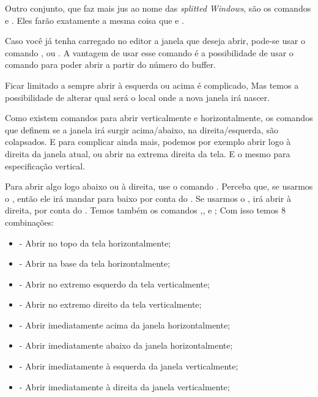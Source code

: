 
Outro conjunto, que faz mais jus ao nome das \textit{splitted Windows}, são os comandos  e 
.
Eles farão exatamente a mesma coisa que  e .


Caso você já tenha carregado no editor a janela que deseja abrir, pode-se usar o comando
, ou .
A vantagem de usar esse comando é a possibilidade de usar o comando 
para poder abrir a partir do número do buffer.


Ficar limitado a sempre abrir à esquerda ou acima é complicado,
Mas temos a possibilidade de alterar qual será o local onde a nova janela irá nascer.

Como existem comandos para abrir verticalmente e horizontalmente, os comandos que definem
se a janela irá surgir acima/abaixo, na direita/esquerda, são colapsados.
E para complicar ainda mais, podemos por exemplo abrir logo à direita da janela atual, ou
abrir na extrema direita da tela.
E o mesmo para especificação vertical.

Para abrir algo logo abaixo ou à direita, use o comando .
Perceba que, se usarmos o , então ele irá mandar para baixo por conta do .
Se usarmos o , irá abrir à direita, por conta do .
Temos também os comandos ,, e ;
Com isso temos 8 combinações:

\begin{itemize}
    \item {} - Abrir no topo da tela horizontalmente;
    \item {} - Abrir na base da tela horizontalmente;
    \item {} - Abrir no extremo esquerdo da tela verticalmente;
    \item {} - Abrir no extremo direito da tela verticalmente;
    \item {} - Abrir imediatamente acima da janela horizontalmente;
    \item {} - Abrir imediatamente abaixo da janela horizontalmente;
    \item {} - Abrir imediatamente à esquerda da janela verticalmente;
    \item {} - Abrir imediatamente à direita da janela verticalmente;
\end{itemize}

